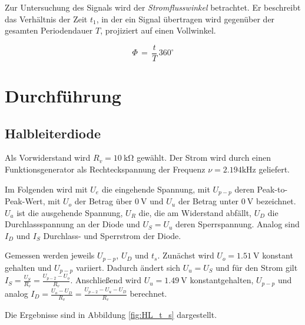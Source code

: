 \documentclass[10pt,a4paper]{scrartcl}
\begin{document}
Zur Untersuchung des Signals wird der \emph{Stromflusswinkel} betrachtet.
Er beschreibt das Verhältnis der Zeit $t_1$,
in der ein Signal übertragen wird gegenüber der gesamten Periodendauer $T$,
projiziert auf einen Vollwinkel.

\begin{equation}
    \Phi\,=\,\frac{t}{T}\,360^\circ
\end{equation}

\section {Durchführung}

\subsection {Halbleiterdiode}

Als Vorwiderstand wird $R_v=10~\mathrm{k\Omega}$ gewählt.
Der Strom wird durch einen Funktionsgenerator als Rechteckspannung der
Frequenz $\nu=2.194\mathrm{kHz}$ geliefert.

Im Folgenden wird mit $U_e$ die eingehende Spannung, mit $U_{p-p}$ deren
Peak-to-Peak-Wert, mit $U_o$ der Betrag über $0~\mathrm V$ und $U_u$ der
Betrag unter $0~\mathrm V$ bezeichnet.
$U_a$ ist die ausgehende Spannung, $U_R$ die, die am Widerstand abfällt,
$U_D$ die Durchlassspannung an der Diode und $U_S=U_u$ deren Sperrspannung.
Analog sind $I_D$ und $I_S$ Durchlass- und Sperrstrom der Diode.

Gemessen werden jeweils $U_{p-p}$, $U_D$ und $t_s$.
Zunächst wird $U_o=1.51~\mathrm V$ konstant gehalten und $U_{p-p}$ variiert.
Dadurch ändert sich $U_u=U_S$ und für den Strom gilt
$I_S=\frac{U_S}{R_v}=\frac{U_{p-2}-U_o}{R_v}$.
Anschließend wird $U_u=1.49~\mathrm V$ konstantgehalten, $U_{p-p}$ und
analog $I_D=\frac{U_o-U_D}{R_v}=\frac{U_{p-2}-U_u-U_D}{R_v}$ berechnet.


Die Ergebnisse sind in Abbildung \ref{fig:HL_t_s} dargestellt.
\end{document}
